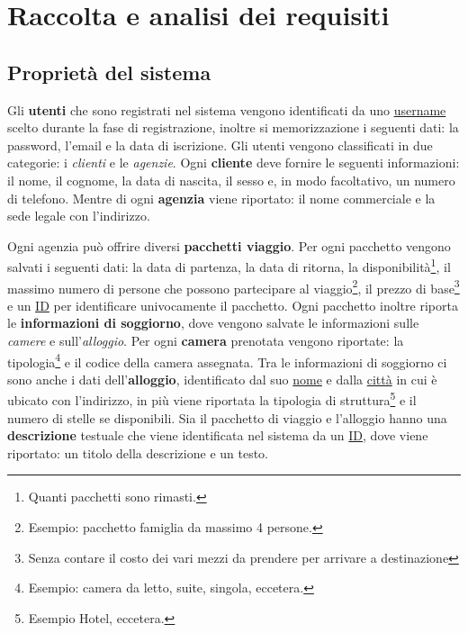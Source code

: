 \section{Raccolta e analisi dei requisiti}
\subsection{Proprietà del sistema}

Gli \textbf{utenti} che sono registrati nel sistema vengono identificati da uno \underline{username} scelto durante la fase di registrazione, inoltre si memorizzazione i seguenti dati: la password, l'email e la data di iscrizione. Gli utenti vengono classificati in due categorie: i \emph{clienti} e le \emph{agenzie}. Ogni \textbf{cliente} deve fornire le seguenti informazioni: il nome, il cognome, la data di nascita, il sesso e, in modo facoltativo, un numero di telefono. Mentre di ogni \textbf{agenzia} viene riportato: il nome commerciale e la sede legale con l'indirizzo.

Ogni agenzia può offrire diversi \textbf{pacchetti viaggio}. Per ogni pacchetto vengono salvati i seguenti dati: la data di partenza, la data di ritorna, la disponibilità\footnote{Quanti pacchetti sono rimasti.}, il massimo numero di persone che possono partecipare al viaggio\footnote{Esempio: pacchetto famiglia da massimo 4 persone.}, il prezzo di base\footnote{Senza contare il costo dei vari mezzi da prendere per arrivare a destinazione} e un \underline{ID} per identificare univocamente il pacchetto. Ogni pacchetto inoltre riporta le \textbf{informazioni di soggiorno}, dove vengono salvate le informazioni sulle \emph{camere} e sull'\emph{alloggio}. Per ogni \textbf{camera} prenotata vengono riportate: la tipologia\footnote{Esempio: camera da letto, suite, singola, eccetera.} e il codice della camera assegnata. Tra le informazioni di soggiorno ci sono anche i dati dell'\textbf{alloggio}, identificato dal suo \underline{nome} e dalla \underline{città} in cui è ubicato con l'indirizzo, in più viene riportata la tipologia di struttura\footnote{Esempio Hotel, eccetera.} e il numero di stelle se disponibili. Sia il pacchetto di viaggio e l'alloggio hanno una \textbf{descrizione} testuale che viene identificata nel sistema da un \underline{ID}, dove viene riportato: un titolo della descrizione e un testo.

